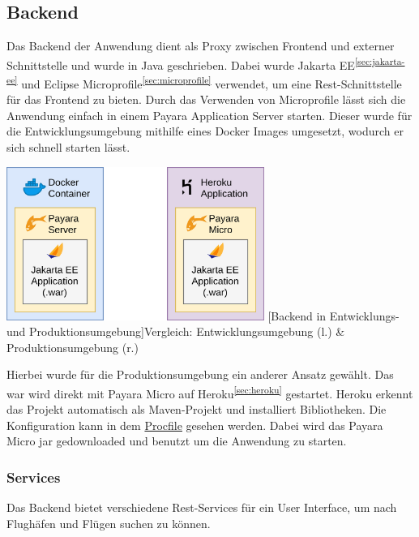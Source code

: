 \documentclass[12pt,twoside,a4paper]{article}
\begin{document}
\begin{sloppypar}
\subsection{Backend}
Das Backend der Anwendung dient als Proxy zwischen Frontend und externer Schnittstelle und wurde in Java geschrieben. Dabei wurde Jakarta EE\textsuperscript{\ref{sec:jakarta-ee}} und Eclipse Microprofile\textsuperscript{\ref{sec:microprofile}} verwendet, um eine Rest-Schnittstelle für das Frontend zu bieten. Durch das Verwenden von Microprofile lässt sich die Anwendung einfach in einem Payara Application Server starten. Dieser wurde für die Entwicklungsumgebung mithilfe eines Docker Images umgesetzt, wodurch er sich schnell starten lässt.
\begin{center}
	\captionsetup{type=figure}
	\includegraphics[height=5cm]{images/backend-structure}
	[Backend in Entwicklungs- und Produktionsumgebung]{Vergleich: Entwicklungsumgebung (l.) \& Produktionsumgebung (r.)}
\end{center}
Hierbei wurde für die Produktionsumgebung ein anderer Ansatz gewählt. Das \acrshort{war} wird direkt mit Payara Micro auf Heroku\textsuperscript{\ref{sec:heroku}} gestartet. Heroku erkennt das Projekt automatisch als Maven-Projekt und installiert Bibliotheken. Die Konfiguration kann in dem \href{https://github.com/featherkraken/featherkraken/blob/master/Procfile}{Procfile} gesehen werden. Dabei wird das Payara Micro \acrshort{jar} gedownloaded und benutzt um die Anwendung zu starten.
\subsubsection{Services}
Das Backend bietet verschiedene Rest-Services für ein User Interface, um nach Flughäfen und Flügen suchen zu können.

\end{sloppypar}
\end{document}
